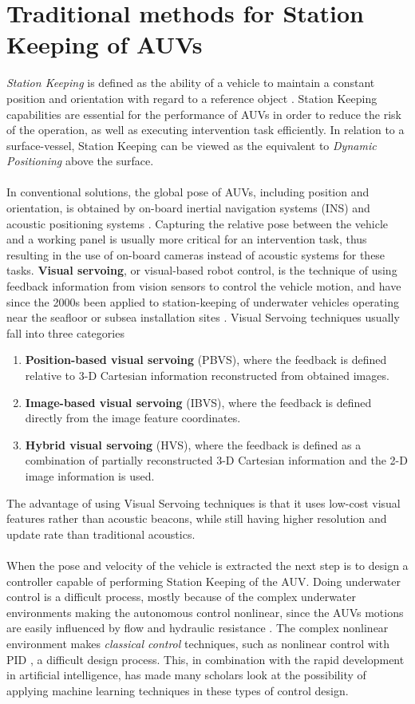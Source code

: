 \section{Traditional methods for Station Keeping of AUVs}
\textit{Station Keeping} is defined as the ability of a vehicle to maintain a constant position and orientation with regard to a reference object \cite{Riedel}. Station Keeping capabilities are essential for the performance of AUVs in order to reduce the risk of the operation, as well as executing intervention task efficiently. In relation to a surface-vessel, Station Keeping can be viewed as the equivalent to \textit{Dynamic Positioning} \cite{Fossen} above the surface.\\\\
In conventional solutions, the global pose of AUVs, including position and orientation, is obtained by on-board inertial navigation systems (INS) and acoustic positioning systems \cite{Gao}. Capturing the relative pose between the vehicle and a working panel is usually more critical for an intervention task, thus resulting in the use of on-board cameras instead of acoustic systems for these tasks. \textbf{Visual servoing}, or visual-based robot control, is the technique of using feedback information from vision sensors to control the vehicle motion, and have since the 2000s been applied to station-keeping of underwater vehicles operating near the seafloor or subsea installation sites \cite{Gao}. Visual Servoing techniques usually fall into three categories
\begin{enumerate}
    \item \textbf{Position-based visual servoing} (PBVS), where the feedback is defined relative to 3-D Cartesian information reconstructed from obtained images.
    \item \textbf{Image-based visual servoing} (IBVS), where the feedback is defined directly from the image feature coordinates.
    \item \textbf{Hybrid visual servoing} (HVS), where the feedback is defined as a combination of partially reconstructed 3-D Cartesian information and the 2-D image information is used.
\end{enumerate}
The advantage of using Visual Servoing techniques is that it uses low-cost visual features rather than acoustic beacons, while still having higher resolution and update rate than traditional acoustics.\\\\
When the pose and velocity of the vehicle is extracted the next step is to design a controller capable of performing Station Keeping of the AUV. Doing underwater control is a difficult process, mostly because of the complex underwater environments making the autonomous control nonlinear, since the AUVs motions are easily influenced by flow and hydraulic resistance \cite{Yu}. The complex nonlinear environment makes \textit{classical control} techniques, such as nonlinear control with PID \cite{Min}, a difficult design process. This, in combination with the rapid development in artificial intelligence, has made many scholars look at the possibility of applying machine learning techniques in these types of control design.\\\\
